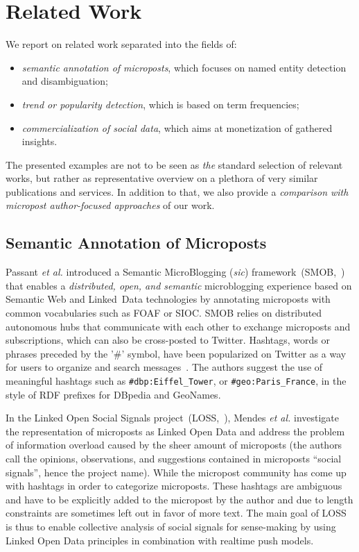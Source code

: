 \documentclass{iosart2c}
\begin{document}
\section{Related Work} \label{sec:relatedwork}
We report on related work separated into the fields of:
\begin{itemize}
\item \emph{semantic annotation of microposts}, which focuses on named entity detection and disambiguation;
\item \emph{trend or popularity detection}, which is based on term frequencies;
\item \emph{commercialization of social data}, which aims at monetization of gathered insights.
\end{itemize}
The presented examples are not to be seen as \emph{the} standard selection of relevant works, but rather as representative overview on a plethora of very similar publications and services.
In addition to that, we also provide a \emph{comparison with micropost author-focused approaches} of our work.

\subsection{Semantic Annotation of Microposts}
Passant \textit{et al.} introduced a Semantic MicroBlogging (\textit{sic}) framework~(SMOB,~\cite{Passant2008}) that enables a \textit{distributed, open, and semantic} microblogging experience based on Semantic Web and Linked~Data technologies by annotating microposts with common vocabularies such as FOAF or SIOC.
SMOB relies on distributed autonomous hubs that communicate with each other to exchange microposts and subscriptions, which can also be cross-posted to Twitter.
Hashtags, words or phrases preceded by the '\#' symbol, have been popularized on Twitter as a way for users to organize and search messages~\cite{hashtag}.
The authors suggest the use of meaningful hashtags such as \texttt{\#dbp:Eiffel\_Tower}, or \texttt{\#geo:Paris\_France}, in the style of RDF prefixes for DBpedia and GeoNames.

In the Linked Open Social Signals project~(LOSS,~\cite{Mendes:LOSS}), Mendes \textit{et al.} investigate the representation of microposts as Linked Open Data and address the problem of information overload caused by the sheer amount of microposts (the authors call the opinions, observations, and suggestions contained in microposts ``social signals'', hence the project name).
While the micropost community has come up with hashtags in order to categorize microposts.
These hashtags are ambiguous and have to be explicitly added to the micropost by the author and due to length constraints are sometimes left out in favor of more text.
The main goal of LOSS is thus to enable collective analysis of social signals for sense-making by using Linked Open Data principles in combination with realtime push models.
\end{document}
